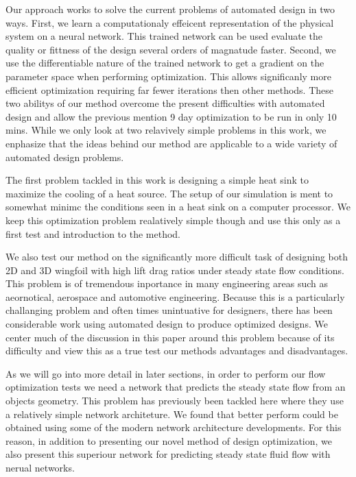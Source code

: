 \documentclass{article} %
\begin{document}
Our approach works to solve the current problems of automated design in two ways. First, we learn a computationaly effeicent representation of the physical system on a neural network. This trained network can be used evaluate the quality or fittness of the design several orders of magnatude faster. Second, we use the differentiable nature of the trained network to get a gradient on the parameter space when performing optimization. This allows significanly more efficient optimization requiring far fewer iterations then other methods. These two abilitys of our method overcome the present difficulties with automated design and allow the previous mention 9 day optimization to be run in only 10 mins. While we only look at two relavively simple problems in this work, we enphasize that the ideas behind our method are applicable to a wide variety of automated design problems.

The first problem tackled in this work is designing a simple heat sink to maximize the cooling of a heat source. The setup of our simulation is ment to somewhat minimc the conditions seen in a heat sink on a computer processor. We keep this optimization problem realatively simple though and use this only as a first test and introduction to the method.

We also test our method on the significantly more difficult task of designing both 2D and 3D wingfoil with high lift drag ratios under steady state flow conditions. This problem is of tremendous inportance in many engineering areas such as aeornotical, aerospace and automotive engineering. Because this is a particularly challanging problem and often times unintuative for designers, there has been considerable work using automated design to produce optimized designs. We center much of the discussion in this paper around this problem because of its difficulty and view this as a true test our methods advantages and disadvantages.

As we will go into more detail in later sections, in order to perform our flow optimization tests we need a network that predicts the steady state flow from an objects geometry. This problem has previously been tackled here where they use a relatively simple network architeture. We found that better perform could be obtained using some of the modern network architecture developments. For this reason, in addition to presenting our novel method of design optimization, we also present this superiour network for predicting steady state fluid flow with nerual networks.
\end{document}
